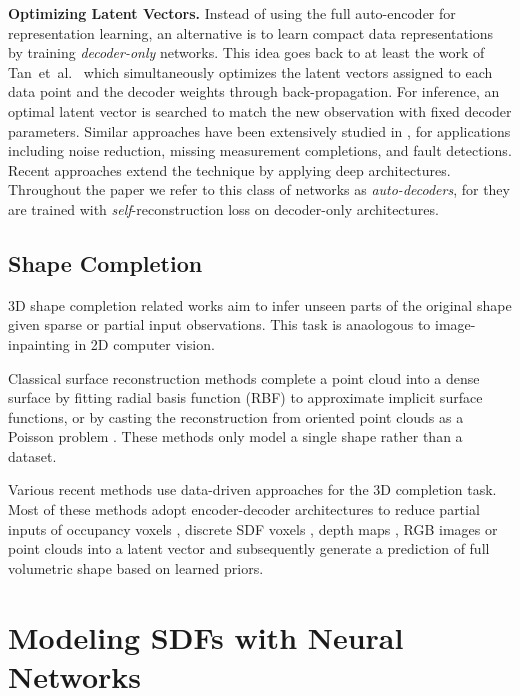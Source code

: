 \documentclass[10pt,twocolumn,letterpaper]{article}
\begin{document}
\noindent\textbf{Optimizing Latent Vectors.}
Instead of using the full auto-encoder for representation learning, an alternative is to learn compact data representations by training \textit{decoder-only} networks. This idea goes back to at least the work of Tan~et~al.~\cite{tan1995reducing} which simultaneously optimizes the latent vectors assigned to each data point and the decoder weights through back-propagation. For inference, an optimal latent vector is searched to match the new observation with fixed decoder parameters. Similar approaches have been extensively studied in \cite{reddy1998input, bouakkaz2012combined, qunxiong2006dimensionality}, for applications including noise reduction, missing measurement completions, and fault detections. Recent approaches \cite{bojanowski18a, fan2018matrix} extend the technique by applying deep architectures. Throughout the paper we refer to this class of networks as \textit{auto-decoders}, for they are trained with {\em self}-reconstruction loss on decoder-only architectures.

\subsection{Shape Completion}\label{related-completion}

3D shape completion related works aim to infer unseen parts of the original shape given sparse or partial input observations. This task is anaologous to image-inpainting in 2D computer vision.

Classical surface reconstruction methods complete a point cloud into a dense surface by fitting radial basis function (RBF) \cite{carr2001reconstruction} to approximate implicit surface functions, or by casting the reconstruction from oriented point clouds as a Poisson problem \cite{kazhdan2013screened}. These methods only model a single shape rather than a dataset.

Various recent methods use data-driven approaches for the 3D completion task. Most of these methods adopt encoder-decoder architectures to reduce partial inputs of occupancy voxels \cite{wu20153d}, discrete SDF voxels \cite{dai2017shape}, depth maps \cite{rock2015completing}, RGB images \cite{choy20163d, wu2018learning} or point clouds \cite{stutz2018learning} into a latent vector and subsequently generate a prediction of full volumetric shape based on learned priors.


\section{Modeling SDFs with Neural Networks} \label{sec: csdf}
\end{document}
